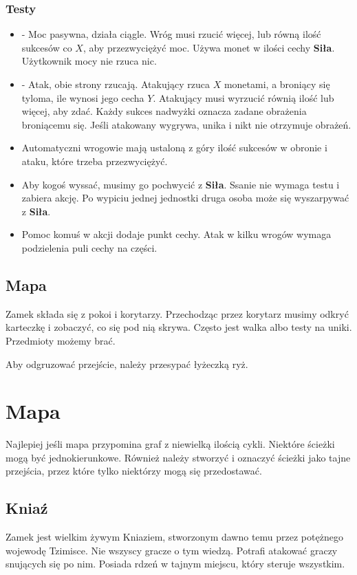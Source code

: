 		\subsubsection{Testy}
			\begin{itemize}[noitemsep]
				\item {} - Moc pasywna, działa ciągle. Wróg musi rzucić więcej, lub równą ilość sukcesów co $X$, aby przezwyciężyć moc. Używa monet w ilości cechy \textbf{Siła}. Użytkownik mocy nie rzuca nic.
				\item {} - Atak, obie strony rzucają. Atakujący rzuca $X$ monetami, a broniący się tyloma, ile wynosi jego cecha $Y$. Atakujący musi wyrzucić równią ilość lub więcej, aby zdać. Każdy sukces nadwyżki oznacza zadane obrażenia broniącemu się. Jeśli atakowany wygrywa, unika i nikt nie otrzymuje obrażeń.
				\item Automatyczni wrogowie mają ustaloną z góry ilość sukcesów w obronie i ataku, które trzeba przezwyciężyć.
				\item Aby kogoś wyssać, musimy go pochwycić z \textbf{Siła}. Ssanie nie wymaga testu i zabiera akcję. Po wypiciu jednej jednostki druga osoba może się wyszarpywać z \textbf{Siła}.
				\item Pomoc komuś w akcji dodaje punkt cechy. Atak w kilku wrogów wymaga podzielenia puli cechy na części.
			\end{itemize}
			
		\subsection{Mapa}
			Zamek składa się z pokoi i korytarzy.
			Przechodząc przez korytarz musimy odkryć karteczkę i zobaczyć, co się pod nią skrywa.
			Często jest walka albo testy na uniki.
			Przedmioty możemy brać.
			
			Aby odgruzować przejście, należy przesypać łyżeczką ryż.
	
\section{Mapa}
	Najlepiej jeśli mapa przypomina graf z niewielką ilością cykli.
	Niektóre ścieżki mogą być jednokierunkowe.
	Również należy stworzyć i oznaczyć ścieżki jako tajne przejścia, przez które tylko niektórzy mogą się przedostawać.
	
	\subsection{Kniaź}
		Zamek jest wielkim żywym Kniaziem, stworzonym dawno temu przez potężnego wojewodę Tzimisce.
		Nie wszyscy gracze o tym wiedzą.
		Potrafi atakować graczy snujących się po nim.
		Posiada rdzeń w tajnym miejscu, który steruje wszystkim.
		

